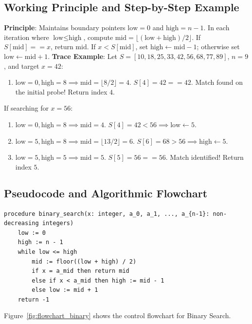 \documentclass[11pt,a4paper,oneside]{report}
\theoremstyle{definition}
\begin{document}
\subsection{Working Principle and Step-by-Step Example}
\textbf{Principle}: Maintains boundary pointers $\text{low} = 0$ and $\text{high} = n - 1$. In each iteration where $\text{low} \le \text{high}$, compute $\text{mid} = \lfloor (\text{low} + \text{high}) / 2 \rfloor$.
If $S[\text{mid}] == x$, return $\text{mid}$. If $x < S[\text{mid}]$, set $\text{high} \leftarrow \text{mid} - 1$; otherwise set $\text{low} \leftarrow \text{mid} + 1$.
\textbf{Trace Example}: Let $S = [10, 18, 25, 33, 42, 56, 68, 77, 89]$, $n = 9$, and target $x = 42$:
\begin{enumerate}
    \item $\text{low}=0, \text{high}=8 \implies \text{mid} = \lfloor 8/2 \rfloor = 4$. $S[4] = 42 == 42$. Match found on the initial probe! Return index $4$.
\end{enumerate}
If searching for $x = 56$:
\begin{enumerate}
    \item $\text{low}=0, \text{high}=8 \implies \text{mid} = 4$. $S[4] = 42 < 56 \implies \text{low} \leftarrow 5$.
    \item $\text{low}=5, \text{high}=8 \implies \text{mid} = \lfloor 13/2 \rfloor = 6$. $S[6] = 68 > 56 \implies \text{high} \leftarrow 5$.
    \item $\text{low}=5, \text{high}=5 \implies \text{mid} = 5$. $S[5] = 56 == 56$. Match identified! Return index $5$.
\end{enumerate}

\subsection{Pseudocode and Algorithmic Flowchart}
\begin{lstlisting}[caption={Pseudocode: Binary Search (Rosen \S3.1, Algorithm 3)}]
procedure binary_search(x: integer, a_0, a_1, ..., a_{n-1}: non-decreasing integers)
    low := 0
    high := n - 1
    while low <= high
        mid := floor((low + high) / 2)
        if x = a_mid then return mid
        else if x < a_mid then high := mid - 1
        else low := mid + 1
    return -1
\end{lstlisting}

Figure~\ref{fig:flowchart_binary} shows the control flowchart for Binary Search.
\end{document}
